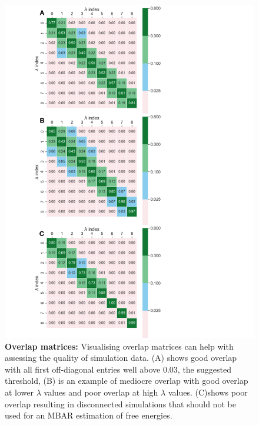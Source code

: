 \documentclass[9pt,bestpractices]{livecoms}
\begin{document}
\begin{figure}
\includegraphics[width=0.95\columnwidth]{figures/fig12_overlap/Figure.pdf}
\caption{\label{fig:overlap} \textbf{Overlap matrices:} Visualising overlap matrices can help with assessing the quality of simulation data. (A) shows good overlap with all first off-diagonal entries well above 0.03, the suggested threshold, (B) is an example of mediocre overlap with good overlap at lower $\lambda$ values and poor overlap at high $\lambda$ values. (C)shows poor overlap resulting in disconnected simulations that should not be used for an MBAR estimation of free energies.}
\end{figure}
\end{document}
